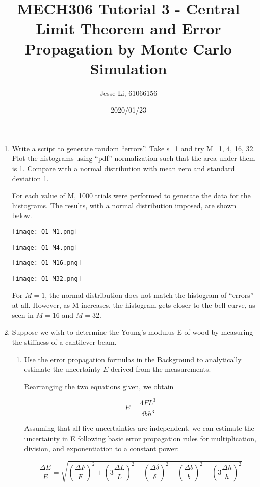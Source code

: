 \documentclass{article}
\begin{document}
\author{Jesse Li, 61066156}
\date{2020/01/23}
\title{MECH306 Tutorial 3 - Central Limit Theorem and Error Propagation by Monte Carlo Simulation}

\maketitle

\begin{enumerate}
    \item Write a script to generate random “errors”. Take s=1 and try M=1, 4, 16, 32. Plot the histograms using “pdf” normalization such that the area under them is 1. Compare with a normal distribution with mean zero and standard deviation 1.


For each value of M, 1000 trials were performed to generate the data for the histograms. The results, with a normal distribution imposed, are shown below.

\texttt{[image: Q1\_M1.png]}

\texttt{[image: Q1\_M4.png]}

\texttt{[image: Q1\_M16.png]}

\texttt{[image: Q1\_M32.png]}

For \(M = 1\), the normal distribution does not match the histogram of “errors” at all. However, as M increases, the histogram gets closer to the bell curve, as seen in \(M=16\) and \(M=32\).


\item Suppose we wish to determine the Young’s modulus E of wood by measuring the stiffness of a cantilever beam.
\begin{enumerate}
    \item Use the error propagation formulas in the Background to analytically estimate the uncertainty $E$ derived from the measurements.

Rearranging the two equations given, we obtain

\[ E=\frac{4FL^3}{\delta b h^3} \]

Assuming that all five uncertainties are independent, we can estimate the uncertainty in E following basic error propagation rules for multiplication, division, and exponentiation to a constant power:

\newcommand{\reluncer}[2][]{\left( #1 \frac{\Delta #2}{#2} \right)^2 }

\begin{equation}
\frac{\Delta E}{E} = \sqrt{\reluncer{F} + \reluncer[3]{L} + \reluncer{\delta} + \reluncer{b} + \reluncer[3]{h}}
\end{equation}



\end{enumerate}
\end{enumerate}
\end{document}
